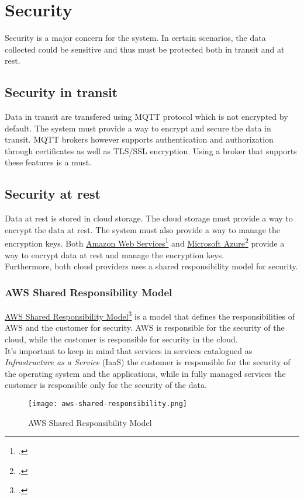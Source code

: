 \newpage
\section{Security}
Security is a major concern for the system. In certain scenarios, the data collected could be sensitive and thus must be protected both in transit and at rest.
    \subsection{Security in transit}
    Data in transit are transfered using MQTT protocol which is not encrypted by default. The system must provide a way to encrypt and secure the data in transit. MQTT brokers however supports authentication and authorization through certificates as well as TLS/SSL encryption. Using a broker that supports these features is a must.
    
    \subsection{Security at rest}
    Data at rest is stored in cloud storage. The cloud storage must provide a way to encrypt the data at rest. The system must also provide a way to manage the encryption keys. Both \href{https://aws.amazon.com/it/}{Amazon Web Services}\footcite{site:aws} and \href{https://azure.microsoft.com/it-it/}{Microsoft Azure}\footcite{site:azure} provide a way to encrypt data at rest and manage the encryption keys.\\ 
    Furthermore, both cloud providers uses a shared responsibility model for security.
    
    \newpage
    \subsubsection{AWS Shared Responsibility Model}
    \href{https://aws.amazon.com/it/compliance/shared-responsibility-model/}{AWS Shared Responsibility Model}\footcite{site:aws-shared-responsibility-model} is a model that defines the responsibilities of AWS and the customer for security. AWS is responsible for the security of the cloud, while the customer is responsible for security in the cloud.\\
    It's important to keep in mind that services in services catalogued as \textit{Infrastructure as a Service} (IaaS) the customer is responsible for the security of the operating system and the applications, while in fully managed services the customer is responsible only for the security of the data.\\
    \begin{figure}[htbp]
        \centering
        \texttt{[image: aws-shared-responsibility.png]}
        \caption{AWS Shared Responsibility Model}
    \end{figure}

